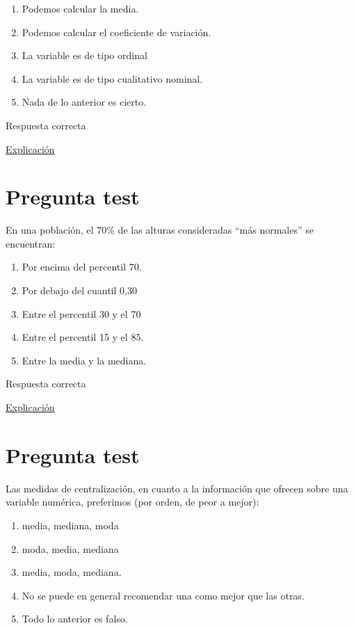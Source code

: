 \documentclass[
]{book}
\providecommand{\tightlist}{%
  \setlength{\itemsep}{0pt}\setlength{\parskip}{0pt}}
\begin{document}
\begin{enumerate}
\def\labelenumi{\alph{enumi})}
\tightlist
\item
  Podemos calcular la media.
\item
  Podemos calcular el coeficiente de variación.
\item
  La variable es de tipo ordinal
\item
  La variable es de tipo cualitativo nominal.
\item
  Nada de lo anterior es cierto.
\end{enumerate}

Respuesta correcta

\href{https://1fjmanzano.github.io/bioestadistica/tipos-de-variables.html}{Explicación}

\hypertarget{pregunta-test-71}{%
\section{Pregunta test}\label{pregunta-test-71}}

En una población, el 70\% de las alturas consideradas ``más normales'' se encuentran:

\begin{enumerate}
\def\labelenumi{\alph{enumi})}
\tightlist
\item
  Por encima del percentil 70.
\item
  Por debajo del cuantil 0,30
\item
  Entre el percentil 30 y el 70
\item
  Entre el percentil 15 y el 85.
\item
  Entre la media y la mediana.
\end{enumerate}

Respuesta correcta

\href{https://1fjmanzano.github.io/bioestadistica/distribuciones-de-probabilidad.html\#distribucio\%CC\%81n-normal}{Explicación}

\hypertarget{pregunta-test-72}{%
\section{Pregunta test}\label{pregunta-test-72}}

Las medidas de centralización, en cuanto a la información que ofrecen sobre una variable numérica, preferimos (por orden, de peor a mejor):

\begin{enumerate}
\def\labelenumi{\alph{enumi})}
\tightlist
\item
  media, mediana, moda
\item
  moda, media, mediana
\item
  media, moda, mediana.
\item
  No se puede en general recomendar una como mejor que las otras.
\item
  Todo lo anterior es falso.
\end{enumerate}
\end{document}
